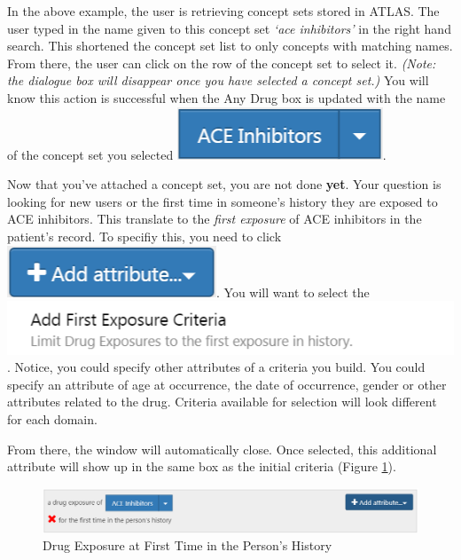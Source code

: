 \documentclass[11pt]{book}
\theoremstyle{definition}
\theoremstyle{definition}
\theoremstyle{definition}
\theoremstyle{remark}
\begin{document}
In the above example, the user is retrieving concept sets stored in ATLAS. The user typed in the name given to this concept set \emph{`ace inhibitors'} in the right hand search. This shortened the concept set list to only concepts with matching names. From there, the user can click on the row of the concept set to select it. \emph{(Note: the dialogue box will disappear once you have selected a concept set.)} You will know this action is successful when the Any Drug box is updated with the name of the concept set you selected \includegraphics{images/Cohorts/concept-added.png}.

Now that you've attached a concept set, you are not done \textbf{yet}. Your question is looking for new users or the first time in someone's history they are exposed to ACE inhibitors. This translate to the \emph{first exposure} of ACE inhibitors in the patient's record. To specifiy this, you need to click \includegraphics{images/Cohorts/addattribute.png}. You will want to select the \includegraphics{images/Cohorts/firstexposurecriteria.png}. Notice, you could specify other attributes of a criteria you build. You could specify an attribute of age at occurrence, the date of occurrence, gender or other attributes related to the drug. Criteria available for selection will look different for each domain.

From there, the window will automatically close. Once selected, this additional attribute will show up in the same box as the initial criteria (Figure \ref{fig:atlasfirsttimeever}).

\begin{figure}

{\centering \includegraphics[width=0.9\linewidth]{images/Cohorts/ATLAS-firsttimeever} 

}

\caption{Drug Exposure at First Time in the Person's History}\label{fig:atlasfirsttimeever}
\end{figure}
\end{document}
